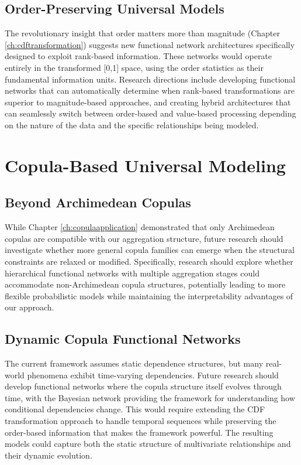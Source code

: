 \documentclass[
	11pt, %
	fleqn, %
	a4paper, %
]{LegrandOrangeBook}
\begin{document}
\subsection{Order-Preserving Universal Models}
The revolutionary insight that order matters more than magnitude (Chapter \ref{ch:cdftransformation}) suggests new functional network architectures specifically designed to exploit rank-based information. These networks would operate entirely in the transformed [0,1] space, using the order statistics as their fundamental information units.
Research directions include developing functional networks that can automatically determine when rank-based transformations are superior to magnitude-based approaches, and creating hybrid architectures that can seamlessly switch between order-based and value-based processing depending on the nature of the data and the specific relationships being modeled.

\section{Copula-Based Universal Modeling}
\subsection{Beyond Archimedean Copulas}
While Chapter \ref{ch:copulaapplication} demonstrated that only Archimedean copulas are compatible with our aggregation structure, future research should investigate whether more general copula families can emerge when the structural constraints are relaxed or modified.
Specifically, research should explore whether hierarchical functional networks with multiple aggregation stages could accommodate non-Archimedean copula structures, potentially leading to more flexible probabilistic models while maintaining the interpretability advantages of our approach.

\subsection{Dynamic Copula Functional Networks}
The current framework assumes static dependence structures, but many real-world phenomena exhibit time-varying dependencies. Future research should develop functional networks where the copula structure itself evolves through time, with the Bayesian network providing the framework for understanding how conditional dependencies change.
This would require extending the CDF transformation approach to handle temporal sequences while preserving the order-based information that makes the framework powerful. The resulting models could capture both the static structure of multivariate relationships and their dynamic evolution.
\end{document}
